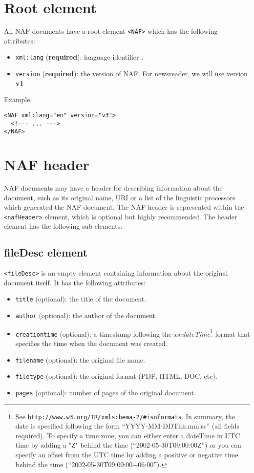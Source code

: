 
\section{Root element}
\label{sec:root-element}

All NAF documents have a root element \texttt{<NAF>} which has the following
attributes:

\begin{itemize}
\item \texttt{xml:lang} (\textbf{required}): language identifier .
\item \texttt{version} (\textbf{required}): the version of NAF. For
  newsreader, we will use version \textbf{v1}
\end{itemize}

Example:
\begin{Verbatim}[fontsize=\small]
<NAF xml:lang="en" version="v3">
  <!--- ... --->
</NAF>
\end{Verbatim}

\section{NAF header}
\label{sec:naf-header}

NAF documents may have a header for describing information about the
document, such as its original name, URI or a list of the linguistic
processors which generated the NAF document. The NAF header is represented
within the \texttt{<nafHeader>} element, which is optional but highly
recommended. The header element has the following sub-elements:

\subsection{fileDesc element}
\label{sec:filedesc-element}

\texttt{<fileDesc>} is an empty element containing information about the
original document itself. It has the following attributes:
\begin{itemize}
\item \texttt{title} (optional): the title of the document.
\item \texttt{author} (optional): the author of the document.
\item \texttt{creationtime} (optional): a timestamp following the
  \emph{xs:dateTime}\footnote{See
      \texttt{http://www.w3.org/TR/xmlschema-2/\#isoformats}. In
    summary, the date is specified following the form
    ``YYYY-MM-DDThh:mm:ss'' (all fields required). To specify a time
    zone, you can either enter a dateTime in UTC time by adding a "Z"
    behind the time (``2002-05-30T09:00:00Z'') or you can specify an
    offset from the UTC time by adding a positive or negative time
    behind the time (``2002-05-30T09:00:00+06:00'').} format that
  specifies the time when the document was created.
\item \texttt{filename} (optional): the original file name.
\item \texttt{filetype} (optional): the original format (PDF, HTML, DOC, etc).
\item \texttt{pages} (optional): number of pages of the original document.
\end{itemize}

